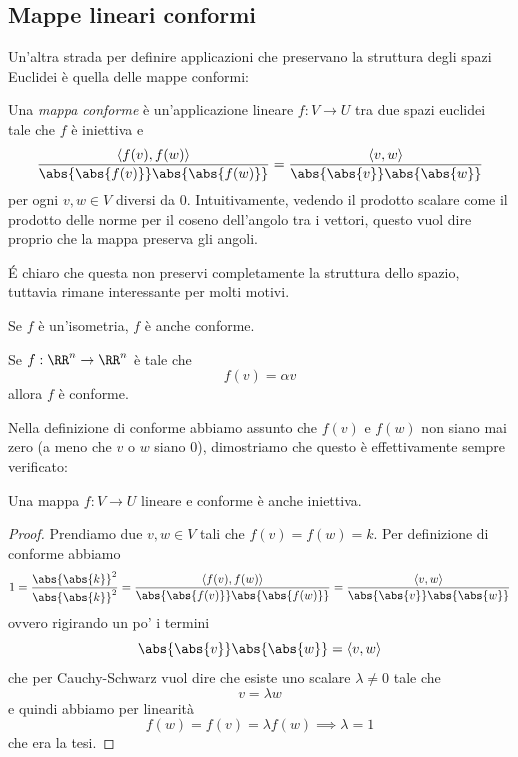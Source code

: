 \documentclass[11pt]{scrartcl}
\begin{document}
   	 \subsection{Mappe lineari conformi}
   	 Un'altra strada per definire applicazioni che preservano la struttura degli spazi Euclidei è quella delle mappe conformi:
   	 \begin{definition}
   	 	Una \textit{mappa conforme} è un'applicazione lineare $f:V\to U$ tra due spazi euclidei tale che $f$ è iniettiva e
   	 	$$\frac{\langle f(v),f(w)\rangle}{\abs{\abs{f(v)}}\abs{\abs{f(w)}}}=\frac{\langle v,w\rangle}{\abs{\abs{v}}\abs{\abs{w}}}$$
   	 	per ogni $v,w\in V$ diversi da $0$. Intuitivamente, vedendo il prodotto scalare come il prodotto delle norme per il coseno dell'angolo tra i vettori, questo vuol dire proprio che la mappa preserva gli angoli.
   	 \end{definition}
   	 \'E chiaro che questa non preservi completamente la struttura dello spazio, tuttavia rimane interessante per molti motivi.
   	 \begin{example}
   	 	Se $f$ è un'isometria, $f$ è anche conforme.
   	 \end{example}
   	 \begin{example}
   	 	Se $f:\RR^n \to \RR^n$ è tale che
   	 	$$f(v)=\alpha v$$
   	 	allora $f$ è conforme. 
   	 \end{example}
   	 Nella definizione di conforme abbiamo assunto che $f(v)$ e $f(w)$ non siano mai zero (a meno che $v$ o $w$ siano $0$), dimostriamo che questo è effettivamente sempre verificato: 
   	 \begin{lemma}
   	 	Una mappa $f:V\to U$ lineare e conforme è anche iniettiva.
   	 \end{lemma}
   	 \begin{proof}
   	 	Prendiamo due $v,w\in V$ tali che $f(v)=f(w)=k$. Per definizione di conforme abbiamo
   	 	$$1=\frac{\abs{\abs{k}}^2}{\abs{\abs{k}}^2}=\frac{\langle f(v),f(w)\rangle}{\abs{\abs{f(v)}}\abs{\abs{f(w)}}}=\frac{\langle v,w\rangle}{\abs{\abs{v}}\abs{\abs{w}}}$$
   	 	ovvero rigirando un po' i termini
   	 	$$\abs{\abs{v}}\abs{\abs{w}}=\langle v,w\rangle$$
   	 	che per Cauchy-Schwarz vuol dire che esiste uno scalare $\lambda\ne 0$ tale che
   	 	$$v=\lambda w$$
   	 	e quindi abbiamo per linearità
   	 	$$f(w)=f(v)=\lambda f(w) \implies \lambda=1$$
   	 	che era la tesi.
   	 \end{proof}
\end{document}
